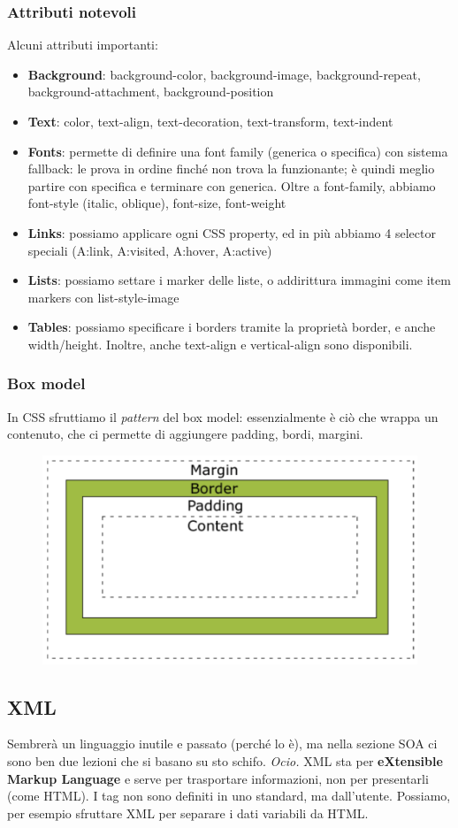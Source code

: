 \documentclass[11pt]{article}
\begin{document}
\subsubsection{Attributi notevoli}
Alcuni attributi importanti:
\begin{itemize}
    \item \textbf{Background}: background-color, background-image, background-repeat, background-attachment, background-position
    \item \textbf{Text}: color, text-align, text-decoration, text-transform, text-indent
    \item \textbf{Fonts}: permette di definire una font family (generica o specifica) con sistema fallback: le prova in ordine finché non trova la funzionante; è quindi meglio partire con specifica e terminare con generica. Oltre a font-family, abbiamo font-style (italic, oblique), font-size, font-weight
    \item \textbf{Links}: possiamo applicare ogni CSS property, ed in più abbiamo 4 selector speciali (A:link, A:visited, A:hover, A:active)
    \item \textbf{Lists}: possiamo settare i marker delle liste, o addirittura immagini come item markers con list-style-image 
    \item \textbf{Tables}: possiamo specificare i borders tramite la proprietà border, e anche width/height. Inoltre, anche text-align e vertical-align sono disponibili.
\end{itemize}

\subsubsection{Box model}
In CSS sfruttiamo il \textit{pattern} del box model: essenzialmente è ciò che wrappa un contenuto, che ci permette di aggiungere padding, bordi, margini. 
\begin{figure}[H]
    \centering
    \includegraphics[width=0.6\linewidth]{res/boxmodel.png}
\end{figure}
\subsection{XML}
Sembrerà un linguaggio inutile e passato (perché lo è), ma nella sezione SOA ci sono ben due lezioni che si basano su sto schifo. \textit{Ocio.} XML sta per \textbf{eXtensible Markup Language} e serve per trasportare informazioni, non per presentarli (come HTML). I tag non sono definiti in uno standard, ma dall'utente. Possiamo, per esempio sfruttare XML per separare i dati variabili da HTML. 
\end{document}
